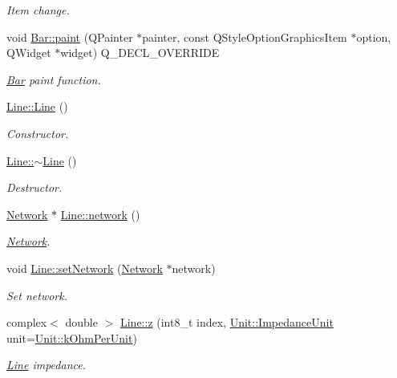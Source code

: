 \begin{DoxyCompactItemize}
\begin{DoxyCompactList}\small\item\em Item change. \end{DoxyCompactList}\item 
void \hyperlink{group___models_gacbb6dbac607412c9c1f9dfcd0cd4d432}{Bar\+::paint} (Q\+Painter $\ast$painter, const Q\+Style\+Option\+Graphics\+Item $\ast$option, Q\+Widget $\ast$widget) Q\+\_\+\+D\+E\+C\+L\+\_\+\+O\+V\+E\+R\+R\+I\+D\+E
\begin{DoxyCompactList}\small\item\em \hyperlink{class_bar}{Bar} paint function. \end{DoxyCompactList}\item 
\hyperlink{group___models_gacc11b8a429d8cdd63ba6803dff5602b3}{Line\+::\+Line} ()
\begin{DoxyCompactList}\small\item\em Constructor. \end{DoxyCompactList}\item 
\hyperlink{group___models_gaabe85f48d22d92b62257091f48174fac}{Line\+::$\sim$\+Line} ()
\begin{DoxyCompactList}\small\item\em Destructor. \end{DoxyCompactList}\item 
\hyperlink{class_network}{Network} $\ast$ \hyperlink{group___models_gaa4cfa330c9c53ddaf86c8f5c17ba1ee0}{Line\+::network} ()
\begin{DoxyCompactList}\small\item\em \hyperlink{class_network}{Network}. \end{DoxyCompactList}\item 
void \hyperlink{group___models_ga320766e09f0ea36b2dd07d3b1db1b72e}{Line\+::set\+Network} (\hyperlink{class_network}{Network} $\ast$network)
\begin{DoxyCompactList}\small\item\em Set network. \end{DoxyCompactList}\item 
complex$<$ double $>$ \hyperlink{group___models_ga0b44ccb2f14635c42d7eab3fe8940692}{Line\+::z} (int8\+\_\+t index, \hyperlink{class_unit_a3747e779c805df24a71961290be3fbdf}{Unit\+::\+Impedance\+Unit} unit=\hyperlink{class_unit_a3747e779c805df24a71961290be3fbdfa9327dc8628a47375d70037499f9d0910}{Unit\+::k\+Ohm\+Per\+Unit})
\begin{DoxyCompactList}\small\item\em \hyperlink{class_line}{Line} impedance. \end{DoxyCompactList}\item 

\end{DoxyCompactItemize}
